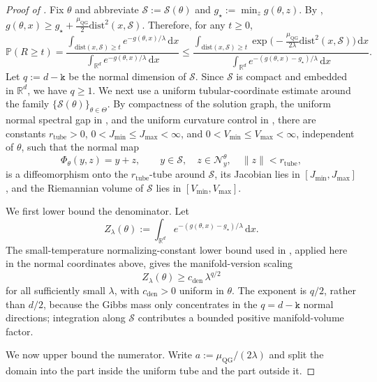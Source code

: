 \documentclass{article}
\theoremstyle{normaltheorem}
\newcommand{\ud}{\mathrm{d}}
\newcommand{\dimk}{\texttt{k}}
\newcommand{\R}{\mathbb{R}}
\newcommand{\calS}{\mathcal{S}}
\newcommand{\calN}{\mathcal{N}}
\begin{document}
\begin{proof}[Proof of ]
Fix $\theta$ and abbreviate \(\mathcal{S}:=\calS(\theta)\) and $g_\star:=\min_z g(\theta,z)$.
By , $g(\theta,x)\ge g_\star+\frac{\mu_{\mathrm{QG}}}{2}\mathrm{dist}^2(x,\mathcal{S})$.
Therefore, for any $t\ge 0$,
\[
\mathbb P(R\ge t)
=\frac{\int_{\mathrm{dist}(x,\mathcal{S})\ge t} e^{-g(\theta,x)/\lambda}\,\ud x}{\int_{\R^d} e^{-g(\theta,x)/\lambda}\,\ud x}
\le
\frac{\int_{\mathrm{dist}(x,\mathcal{S})\ge t} \exp\!\big(-\tfrac{\mu_{\mathrm{QG}}}{2\lambda}\mathrm{dist}^2(x,\mathcal{S})\big)\,\ud x}{\int_{\R^d} e^{-(g(\theta,x)-g_\star)/\lambda}\,\ud x}.
\]
Let \(q:=d-\dimk\) be the normal dimension of \(\mathcal S\). Since \(\mathcal S\) is compact and embedded in
\(\R^d\), we have \(q\ge 1\).
We next use a uniform tubular-coordinate estimate around the family \(\{\calS(\theta)\}_{\theta\in\Theta}\).
By compactness of the solution graph, the uniform normal spectral gap in , and the uniform curvature
control in , there are constants \(r_{\mathrm{tube}}>0\), \(0<J_{\min}\le J_{\max}<\infty\),
and \(0<V_{\min}\le V_{\max}<\infty\), independent of \(\theta\), such that the normal map
\[
\Phi_\theta(y,z)=y+z,\qquad y\in\mathcal S,\quad z\in\calN_y^\theta,\quad \|z\|<r_{\mathrm{tube}},
\]
is a diffeomorphism onto the \(r_{\mathrm{tube}}\)-tube around \(\mathcal S\), its Jacobian lies in
\([J_{\min},J_{\max}]\), and the Riemannian volume of \(\mathcal S\) lies in \([V_{\min},V_{\max}]\).

We first lower bound the denominator. Let
\[
Z_\lambda(\theta):=\int_{\R^d} e^{-(g(\theta,x)-g_\star)/\lambda}\,\ud x .
\]
The small-temperature normalizing-constant lower bound used in
\citet[Lem.~D.1]{masiha2025superquantile}, applied here in the normal coordinates above, gives the manifold-version
scaling
\begin{equation}\label{eq:gibbs-den-lower}
Z_\lambda(\theta)\ge c_{\mathrm{den}}\,\lambda^{q/2}
\end{equation}
for all sufficiently small \(\lambda\), with \(c_{\mathrm{den}}>0\) uniform in \(\theta\). The exponent is \(q/2\), rather
than \(d/2\), because the Gibbs mass only concentrates in the \(q=d-\dimk\) normal directions; integration along
\(\mathcal S\) contributes a bounded positive manifold-volume factor.

We now upper bound the numerator. Write \(a:=\mu_{\mathrm{QG}}/(2\lambda)\) and split the domain into the part inside the
uniform tube and the part outside it.


\end{proof}
\end{document}
